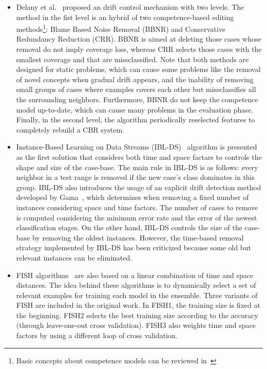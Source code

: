 \documentclass[preprint,12pt]{elsarticle}
\begin{document}
\begin{itemize}
	\item Delany et al.~\cite{delany05} proposed an drift control mechanism with two levels. The method in the fist level is an hybrid of two competence-based editing methods\footnote{Basic concepts about competence models can be reviewed in~\cite{smyth95}}: Blame Based Noise Removal (BBNR) and Conservative Redundancy Reduction (CRR). BBNR is aimed at deleting those cases whose removal do not imply coverage loss, whereas CRR selects those cases with the smallest coverage and that are missclassified. Note that both methods are designed for static problems, which can cause some problems like the removal of novel concepts when gradual drift appears, and the inability of removing small groups of cases where examples covers each other but missclassifies all the surrounding neighbors. Furthermore, BBNR do not keep the competence model up-to-date, which can cause many problems in the evaluation phase. Finally, in the second level, the algorithm periodically reselected features to completely rebuild a CBR system.
	\item Instance-Based Learning on Data Streams (IBL-DS)~\cite{berin07} algorithm is presented as the first solution that considers both time and space factars to controls the shape and size of the case-base. The main rule in IBL-DS is as follows: every neighbor in a test range is removed if the new case's class dominates in this group. IBL-DS also introduces the usage of an explicit drift detection method developed by Gama~\cite{gama04}, which determines when removing a fixed number of instances considering space and time factors. The number of cases to remove is computed considering the minimum error rate and the error of the newest classification stages. On the other hand, IBL-DS controls the size of the case-base by removing the oldest instances. However, the time-based removal strategy implemented by IBL-DS has been criticized because some old but relevant instances can be eliminated.
	\item FISH algorithms~\cite{zlio11} are also based on a linear combination of time and space distances. The idea behind these algorithms is to dynamically select a set of relevant examples for training each model in the ensemble. Three variants of FISH are included in the original work. In FISH1, the training size is fixed at the beginning. FISH2 selects the best training size according to the accuracy (through leave-one-out cross validation). FISH3 also weights time and space factors by using a different loop of cross validation.	

\end{itemize}
\end{document}
